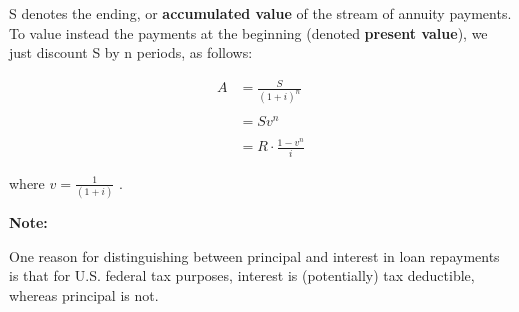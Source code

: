 \documentclass[12pt]{article}
\begin{document}
\begin{flushleft}
    S denotes the ending, or \textbf{accumulated value} of the stream of annuity payments. To value instead
    the payments at the beginning (denoted \textbf{present value}), we just discount S by n periods, as follows:
\end{flushleft}
\vspace{-.1in}

\begin{align*}
    A & = \frac{S}{(1 + i)^n}       \\\\
      & = Sv^n                      \\\\
      & = R \cdot \frac{1 - v^n}{i}
\end{align*}

\begin{flushleft}
    where {\large $ v = \frac{1}{(1+i)} $ }.
\end{flushleft}
\vspace{.1in}

\begin{flushleft}
    \textbf{Note:} \\
\end{flushleft}

\begin{flushleft}
    One reason for distinguishing between principal and interest in loan repayments is that for U.S.
    federal tax purposes, interest is (potentially) tax deductible, whereas principal is not.
\end{flushleft}
\end{document}
